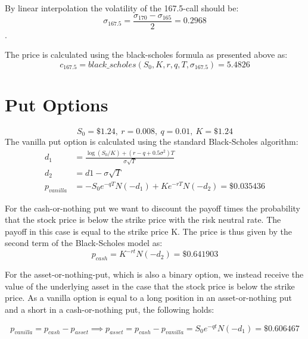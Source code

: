 \documentclass{article}
\begin{document}
By linear interpolation the volatility of the 167.5-call should be: 
$$\sigma_{167.5} = \frac{\sigma_{170} - \sigma_{165}}{2} = 0.2968$$.

The price is calculated using the black-scholes formula as presented above as: 
$$c_{167.5} = black\_scholes(S_0, K, r, q, T, \sigma_{167.5}) = 5.4826$$

\section{Put Options}
$$S_0 = \$1.24, \ r = 0.008, \ q = 0.01, \ K=\$1.24$$
The vanilla put option is calculated using the standard Black-Scholes algorithm:
\begin{align*}
	d_1 &= \frac{\log(S_0 / K) + (r - q + 0.5 \sigma^2)T}{\sigma \sqrt{T}} \\
	d_2 &= d1 - \sigma \sqrt{T} \\
    p_{vanilla} &= -S_0 e^{-qT} N(-d_1) + K e^{-rT}N(-d_2) = \$0.035436
\end{align*}

For the cash-or-nothing put we want to discount the payoff times the probability that the stock price is below the strike price with the risk neutral rate. The payoff in this case is equal to the strike price K. The price is thus given by the second term of the Black-Scholes model as:
$$p_{cash} = K^{-rt}N(-d_2) = \$ 0.641903$$

For the asset-or-nothing-put, which is also a binary option, we instead receive the value of the underlying asset in the case that the stock price is below the strike price. As a vanilla option is equal to a long position in an asset-or-nothing put and a short in a cash-or-nothing put, the following holds: 

$$p_{vanilla} = p_{cash} - p_{asset} \implies p_{asset} = p_{cash} - p_{vanilla} = S_0e^{-qt} N(-d_1) = \$0.606467$$
\end{document}
